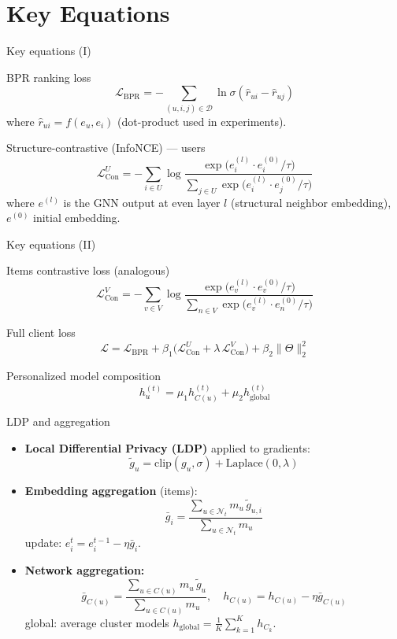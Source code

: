\documentclass{beamer}
\begin{document}
\section{Key Equations}
\begin{frame}{Key equations (I)}
  \begin{block}{BPR ranking loss}
    \[
      \mathcal{L}_{\text{BPR}} = - \sum_{(u,i,j)\in \mathcal{D}} \ln \sigma(\hat r_{ui} - \hat r_{uj})
    \]
    where $\hat r_{ui}=f(e_u,e_i)$ (dot-product used in experiments).
  \end{block}
  \begin{block}{Structure-contrastive (InfoNCE) — users}
    \[
    \mathcal{L}_{\text{Con}}^{U} = -\sum_{i\in U}\log \frac{\exp\big(e_i^{(l)}\cdot e_i^{(0)}/\tau\big)}
    {\sum_{j\in U}\exp\big(e_i^{(l)}\cdot e_j^{(0)}/\tau\big)}
    \]
    where $e^{(l)}$ is the GNN output at even layer $l$ (structural neighbor embedding), $e^{(0)}$ initial embedding.
  \end{block}
\end{frame}

\begin{frame}{Key equations (II)}
  \begin{block}{Items contrastive loss (analogous)}
    \[
    \mathcal{L}_{\text{Con}}^{V} = -\sum_{v\in V}\log \frac{\exp\big(e_v^{(l)}\cdot e_v^{(0)}/\tau\big)}
    {\sum_{n\in V}\exp\big(e_v^{(l)}\cdot e_n^{(0)}/\tau\big)}
    \]
  \end{block}
  \begin{block}{Full client loss}
    \[
      \mathcal{L} = \mathcal{L}_{\text{BPR}} + \beta_1\big(\mathcal{L}_{\text{Con}}^{U} + \lambda \,\mathcal{L}_{\text{Con}}^{V}\big) + \beta_2\|\Theta\|_2^2
    \]
  \end{block}
  \begin{block}{Personalized model composition}
    \[
      h_u^{(t)} = \mu_1 h_{C(u)}^{(t)} + \mu_2 h_{\text{global}}^{(t)}
    \]
  \end{block}
\end{frame}

\begin{frame}{LDP and aggregation}
  \begin{itemize}
    \item \textbf{Local Differential Privacy (LDP)} applied to gradients:
      \[
        \tilde g_u = \mathrm{clip}(g_u,\sigma) + \mathrm{Laplace}(0,\lambda)
      \]
    \item \textbf{Embedding aggregation} (items):
      \[
        \bar g_i = \frac{\sum_{u\in \mathcal{N}_t} m_u \,\tilde g_{u,i}}{\sum_{u\in \mathcal{N}_t} m_u}
      \]
      update: $e_i^{t}=e_i^{t-1}-\eta \bar g_i$.
    \item \textbf{Network aggregation:}
      \[
        \bar g_{C(u)} = \frac{\sum_{u\in C(u)} m_u\,\tilde g_u}{\sum_{u\in C(u)} m_u},\quad
        h_{C(u)} = h_{C(u)} - \eta \bar g_{C(u)}
      \]
      global: average cluster models $h_{\text{global}} = \frac{1}{K}\sum_{k=1}^K h_{C_k}$.
  \end{itemize}
\end{frame}
\end{document}
